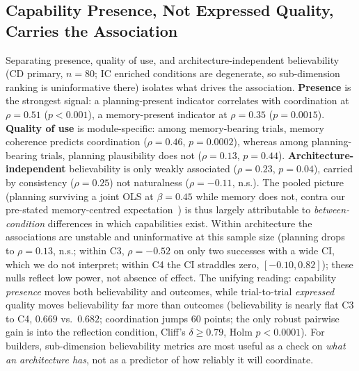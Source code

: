 \documentclass[runningheads]{llncs}
\begin{document}
\subsection{Capability Presence, Not Expressed Quality, Carries the Association}\label{sec:results-drivers}
Separating presence, quality of use, and architecture-independent believability (CD primary, $n=80$; IC enriched conditions are degenerate, so sub-dimension ranking is uninformative there) isolates what drives the association. \textbf{Presence} is the strongest signal: a planning-present indicator correlates with coordination at $\rho = 0.51$ ($p<0.001$), a memory-present indicator at $\rho = 0.35$ ($p=0.0015$). \textbf{Quality of use} is module-specific: among memory-bearing trials, memory coherence predicts coordination ($\rho = 0.46$, $p=0.0002$), whereas among planning-bearing trials, planning plausibility does not ($\rho = 0.13$, $p=0.44$). \textbf{Architecture-independent} believability is only weakly associated ($\rho = 0.23$, $p=0.04$), carried by consistency ($\rho=0.25$) not naturalness ($\rho=-0.11$, n.s.). The pooled picture (planning surviving a joint OLS at $\beta=0.45$ while memory does not, contra our pre-stated memory-centred expectation~\cite{park2023generative,hishiki2026memory}) is thus largely attributable to \emph{between-condition} differences in which capabilities exist. Within architecture the associations are unstable and uninformative at this sample size (planning drops to $\rho=0.13$, n.s.; within C3, $\rho=-0.52$ on only two successes with a wide CI, which we do not interpret; within C4 the CI straddles zero, $[-0.10,0.82]$); these nulls reflect low power, not absence of effect. The unifying reading: capability \emph{presence} moves both believability and outcomes, while trial-to-trial \emph{expressed} quality moves believability far more than outcomes (believability is nearly flat C3 to C4, $0.669$ vs.\ $0.682$; coordination jumps 60 points; the only robust pairwise gain is into the reflection condition, Cliff's $\delta\geq0.79$, Holm $p<0.0001$). For builders, sub-dimension believability metrics are most useful as a check on \emph{what an architecture has}, not as a predictor of how reliably it will coordinate.
\end{document}

